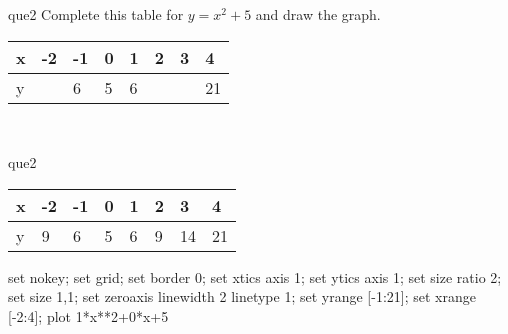 \documentclass[13.5pt, varwidth=true]{beamer}
\begin{document}
\begin{frame}[shrink=19,fragile]
	\begin{beamercolorbox}[rounded=true, left, shadow=true,wd=14.8cm]{que2}
		 Complete this table for $y = x^{2} + 5$ and draw the graph. \\[0.3cm] \renewcommand{\arraystretch}{1.2}\begin{tabular}{|C|C|C|C|C|C|C|C|} \hline x & -2 & -1 & 0 & 1 & 2 & 3 & 4 \\ \hline y &  & 6 & 5 & 6 &  &  & 21\\ \hline \end{tabular}\\[0.3cm]
	\end{beamercolorbox}
\end{frame}
\begin{frame}[shrink=19,fragile]
	\begin{beamercolorbox}[rounded=true, left, shadow=true,wd=14.8cm]{que2}
 		\renewcommand{\arraystretch}{1.2}\begin{tabular}{|C|C|C|C|C|C|C|C|} \hline x & -2 & -1 & 0 & 1 & 2 & 3 & 4 \\ \hline y & 9 & 6 & 5 & 6 & 9 & 14 & 21\\ \hline \end{tabular}\begin{gnuplot}[terminal=pdf] set nokey; set grid; set border 0; set xtics axis 1; set ytics axis 1; set size ratio 2; set size 1,1; set zeroaxis linewidth 2 linetype 1; set yrange [-1:21]; set xrange [-2:4]; plot 1*x**2+0*x+5 \end{gnuplot}
	\end{beamercolorbox}
\end{frame}
\end{document}
